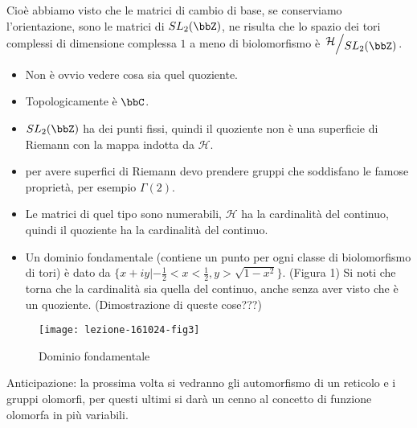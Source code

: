 Cioè abbiamo visto che le matrici di cambio di base, se conserviamo l'orientazione, sono le matrici di $SL_2(\bbZ)$, ne risulta che lo spazio dei tori complessi di dimensione complessa $1$ a meno di biolomorfismo è $\quotient{\mathcal{H}}{SL_2(\bbZ)}$.

\begin{osservazione}
\begin{itemize}
\item Non è ovvio vedere cosa sia quel quoziente.
\item Topologicamente è $\bbC$.
\item $SL_2(\bbZ)$ ha dei punti fissi, quindi il quoziente non è una superficie di Riemann con la mappa indotta da $\mathcal{H}$.
\item per avere superfici di Riemann devo prendere gruppi che soddisfano le famose proprietà, per esempio $\Gamma (2)$.
\item Le matrici di quel tipo sono numerabili, $\mathcal H$ ha la cardinalità del continuo, quindi il quoziente ha la cardinalità del continuo.
\item Un dominio fondamentale (contiene un punto per ogni classe di biolomorfismo di tori) è dato da $\{ x+iy | -\frac{1}{2}<x<\frac{1}{2}, y>\sqrt{1-x^2}\}$. (Figura 1)
Si noti che torna che la cardinalità sia quella del continuo, anche senza aver visto che è un quoziente. (Dimostrazione di queste cose???)
\end{itemize}
\end{osservazione}

\begin{figure}[h]
\texttt{[image: lezione-161024-fig3]}
\caption{Dominio fondamentale}\label{fig:2}
\end{figure}

Anticipazione: la prossima volta si vedranno gli automorfismo di un reticolo e i gruppi olomorfi, per questi ultimi si darà un cenno al concetto di funzione olomorfa in più variabili.
